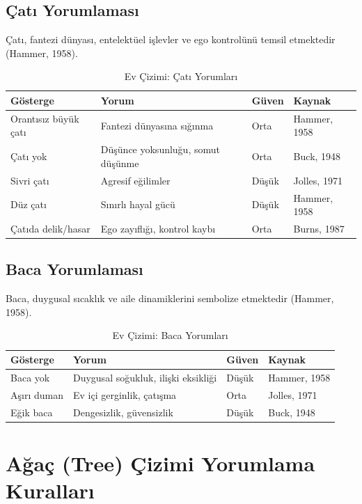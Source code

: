 \subsection{Çatı Yorumlaması}

Çatı, fantezi dünyası, entelektüel işlevler ve ego kontrolünü temsil etmektedir (Hammer, 1958).

\begin{table}[H]
\centering
\caption{Ev Çizimi: Çatı Yorumları}
\label{tab:evcati}
\begin{tabular}{p{3.5cm}p{5.5cm}p{2cm}p{2cm}}
\toprule
\textbf{Gösterge} & \textbf{Yorum} & \textbf{Güven} & \textbf{Kaynak} \\
\midrule
Orantısız büyük çatı & Fantezi dünyasına sığınma & Orta & Hammer, 1958 \\
Çatı yok & Düşünce yoksunluğu, somut düşünme & Orta & Buck, 1948 \\
Sivri çatı & Agresif eğilimler & Düşük & Jolles, 1971 \\
Düz çatı & Sınırlı hayal gücü & Düşük & Hammer, 1958 \\
Çatıda delik/hasar & Ego zayıflığı, kontrol kaybı & Orta & Burns, 1987 \\
\bottomrule
\end{tabular}
\end{table}

\subsection{Baca Yorumlaması}

Baca, duygusal sıcaklık ve aile dinamiklerini sembolize etmektedir (Hammer, 1958).

\begin{table}[H]
\centering
\caption{Ev Çizimi: Baca Yorumları}
\label{tab:evbaca}
\begin{tabular}{p{3.5cm}p{5.5cm}p{2cm}p{2cm}}
\toprule
\textbf{Gösterge} & \textbf{Yorum} & \textbf{Güven} & \textbf{Kaynak} \\
\midrule
Baca yok & Duygusal soğukluk, ilişki eksikliği & Düşük & Hammer, 1958 \\
Aşırı duman & Ev içi gerginlik, çatışma & Orta & Jolles, 1971 \\
Eğik baca & Dengesizlik, güvensizlik & Düşük & Buck, 1948 \\
\bottomrule
\end{tabular}
\end{table}

\section{Ağaç (Tree) Çizimi Yorumlama Kuralları}

